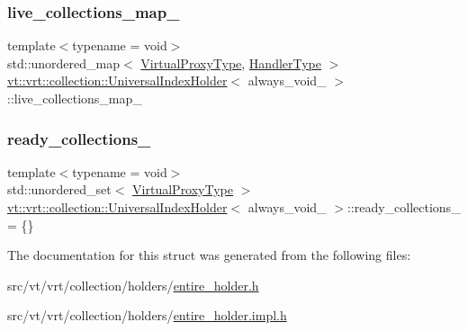 \mbox{\label{structvt_1_1vrt_1_1collection_1_1_universal_index_holder_a42b948be40223918c12a531e2f7a290e}} 
\subsubsection{\texorpdfstring{live\+\_\+collections\+\_\+map\+\_\+}{live\_collections\_map\_}}
{\footnotesize\ttfamily template$<$typename  = void$>$ \\
std\+::unordered\+\_\+map$<$ \hyperlink{namespacevt_a1b417dd5d684f045bb58a0ede70045ac}{Virtual\+Proxy\+Type}, \hyperlink{namespacevt_af64846b57dfcaf104da3ef6967917573}{Handler\+Type} $>$ \hyperlink{structvt_1_1vrt_1_1collection_1_1_universal_index_holder}{vt\+::vrt\+::collection\+::\+Universal\+Index\+Holder}$<$ always\+\_\+void\+\_\+ $>$\+::live\+\_\+collections\+\_\+map\+\_\+\hspace{0.3cm}{\ttfamily [static]}}

\mbox{\label{structvt_1_1vrt_1_1collection_1_1_universal_index_holder_a68ef587e677d634684e27732e9cbf8e8}} 
\subsubsection{\texorpdfstring{ready\+\_\+collections\+\_\+}{ready\_collections\_}}
{\footnotesize\ttfamily template$<$typename  = void$>$ \\
std\+::unordered\+\_\+set$<$ \hyperlink{namespacevt_a1b417dd5d684f045bb58a0ede70045ac}{Virtual\+Proxy\+Type} $>$ \hyperlink{structvt_1_1vrt_1_1collection_1_1_universal_index_holder}{vt\+::vrt\+::collection\+::\+Universal\+Index\+Holder}$<$ always\+\_\+void\+\_\+ $>$\+::ready\+\_\+collections\+\_\+ = \{\}\hspace{0.3cm}{\ttfamily [static]}}



The documentation for this struct was generated from the following files\+:\begin{DoxyCompactItemize}
\item 
src/vt/vrt/collection/holders/\hyperlink{entire__holder_8h}{entire\+\_\+holder.\+h}\item 
src/vt/vrt/collection/holders/\hyperlink{entire__holder_8impl_8h}{entire\+\_\+holder.\+impl.\+h}\end{DoxyCompactItemize}
